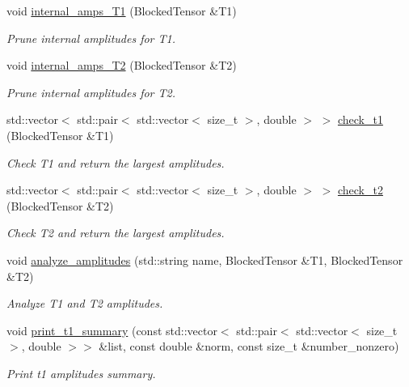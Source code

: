 \begin{DoxyCompactItemize}
void \mbox{\hyperlink{classforte_1_1_s_a_d_s_r_g_a8beb52cecfa37d6950518049b8eac896}{internal\+\_\+amps\+\_\+\+T1}} (Blocked\+Tensor \&T1)
\begin{DoxyCompactList}\small\item\em Prune internal amplitudes for T1. \end{DoxyCompactList}\item 
void \mbox{\hyperlink{classforte_1_1_s_a_d_s_r_g_acb26fe6771267c6dae752be89943875c}{internal\+\_\+amps\+\_\+\+T2}} (Blocked\+Tensor \&T2)
\begin{DoxyCompactList}\small\item\em Prune internal amplitudes for T2. \end{DoxyCompactList}\item 
std\+::vector$<$ std\+::pair$<$ std\+::vector$<$ size\+\_\+t $>$, double $>$ $>$ \mbox{\hyperlink{classforte_1_1_s_a_d_s_r_g_af81f8ba84819b927978bb1b2184475fd}{check\+\_\+t1}} (Blocked\+Tensor \&T1)
\begin{DoxyCompactList}\small\item\em Check T1 and return the largest amplitudes. \end{DoxyCompactList}\item 
std\+::vector$<$ std\+::pair$<$ std\+::vector$<$ size\+\_\+t $>$, double $>$ $>$ \mbox{\hyperlink{classforte_1_1_s_a_d_s_r_g_a013fadc5cc01c1eb8ca00b28f3ffc13a}{check\+\_\+t2}} (Blocked\+Tensor \&T2)
\begin{DoxyCompactList}\small\item\em Check T2 and return the largest amplitudes. \end{DoxyCompactList}\item 
void \mbox{\hyperlink{classforte_1_1_s_a_d_s_r_g_a40adb715c0cb20268ed89b2239d2528b}{analyze\+\_\+amplitudes}} (std\+::string name, Blocked\+Tensor \&T1, Blocked\+Tensor \&T2)
\begin{DoxyCompactList}\small\item\em Analyze T1 and T2 amplitudes. \end{DoxyCompactList}\item 
void \mbox{\hyperlink{classforte_1_1_s_a_d_s_r_g_aa48af6f1422a5b7649dc0d8c8cbf7eb5}{print\+\_\+t1\+\_\+summary}} (const std\+::vector$<$ std\+::pair$<$ std\+::vector$<$ size\+\_\+t $>$, double $>$$>$ \&list, const double \&norm, const size\+\_\+t \&number\+\_\+nonzero)
\begin{DoxyCompactList}\small\item\em Print t1 amplitudes summary. \end{DoxyCompactList}\item 
$$
\end{DoxyCompactItemize}

